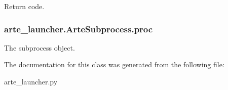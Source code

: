 Return code. 

\subsubsection[{proc}]{\setlength{\rightskip}{0pt plus 5cm}arte\+\_\+launcher.\+Arte\+Subprocess.\+proc}\label{classarte__launcher_1_1_arte_subprocess_ae02d6c7060dea02ddb7f9cebca23d305}


The subprocess object. 



The documentation for this class was generated from the following file\+:\begin{DoxyCompactItemize}
\item 
arte\+\_\+launcher.\+py\end{DoxyCompactItemize}
